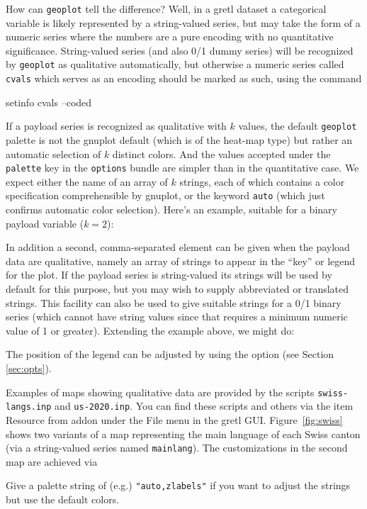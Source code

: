 \documentclass{article}
\begin{document}
How can \texttt{geoplot} tell the difference? Well, in a gretl dataset
a categorical variable is likely represented by a string-valued
series, but may take the form of a numeric series where the numbers
are a pure encoding with no quantitative significance. String-valued
series (and also 0/1 dummy series) will be recognized by
\texttt{geoplot} as qualitative automatically, but otherwise a numeric
series called \texttt{cvals} which serves as an encoding should be
marked as such, using the command
\begin{code}
setinfo cvals --coded
\end{code}
If a payload series is recognized as qualitative with $k$ values, the
default \texttt{geoplot} palette is not the gnuplot default (which is
of the heat-map type) but rather an automatic selection of $k$
distinct colors. And the values accepted under the \texttt{palette}
key in the \texttt{options} bundle are simpler than in the
quantitative case. We expect either the name of an array of $k$
strings, each of which contains a color specification comprehensible
by \textsf{gnuplot}, or the keyword \texttt{auto} (which just confirms
automatic color selection). Here's an example, suitable for a binary
payload variable ($k=2$):
In addition a second, comma-separated element can be given when the
payload data are qualitative, namely an array of strings to appear in
the ``key'' or legend for the plot. If the payload series is
string-valued its strings will be used by default for this purpose,
but you may wish to supply abbreviated or translated strings. This
facility can also be used to give suitable strings for a 0/1 binary
series (which cannot have string values since that requires a minimum
numeric value of 1 or greater). Extending the example above, we might
do:
The position of the legend can be adjusted by using the 
option (see Section \ref{sec:opts}).

Examples of maps showing qualitative data are provided by the scripts
\texttt{swiss-langs.inp} and \texttt{us-2020.inp}. You can find these
scripts and others via the item \textsf{Resource from addon} under the
\textsf{File} menu in the gretl GUI. Figure~\ref{fig:swiss} shows two
variants of a map representing the main language of each Swiss canton
(via a string-valued series named \texttt{mainlang}). The
customizations in the second map are achieved via
Give a palette string of (e.g.) \verb|"auto,zlabels"| if you want to
adjust the strings but use the default colors.
\end{document}
